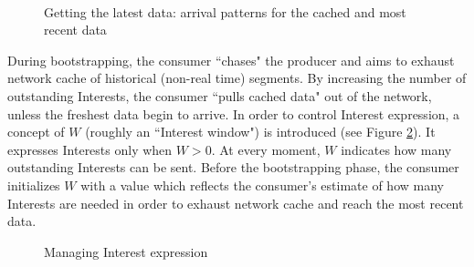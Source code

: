 \documentclass{icn/sig-alternate-2012} %
\begin{document}
\begin{figure}[t!]
\centering

\\

\caption{Getting the latest data: arrival patterns for the cached and most recent data}
\label{fig:inter-arrival}
\end{figure}

During bootstrapping, the consumer ``chases" the producer and aims to exhaust network cache of historical (non-real time) segments. By increasing the number of outstanding Interests, the consumer ``pulls cached data" out of the network, unless the freshest data begin to arrive. In order to control Interest expression, a concept of $W$ (roughly an ``Interest window") is introduced (see Figure \ref{fig:w-concept}). It expresses Interests only when $W > 0$. At every moment, $W$ indicates how many outstanding Interests can be sent. Before the bootstrapping phase, the consumer initializes $W$ with a value which reflects the consumer's estimate of how many Interests are needed in order to exhaust network cache and reach the most recent data. 

\begin{figure}[t!]
\centering


\caption{Managing Interest expression}
\label{fig:w-concept}
\end{figure}
\end{document}
